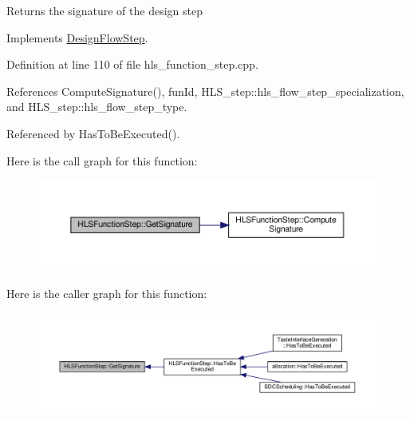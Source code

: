 \begin{DoxyReturn}{Returns}
the signature of the design step 
\end{DoxyReturn}


Implements \hyperlink{classDesignFlowStep_ab111e3d4058615c2dedc0505978d4699}{Design\+Flow\+Step}.



Definition at line 110 of file hls\+\_\+function\+\_\+step.\+cpp.



References Compute\+Signature(), fun\+Id, H\+L\+S\+\_\+step\+::hls\+\_\+flow\+\_\+step\+\_\+specialization, and H\+L\+S\+\_\+step\+::hls\+\_\+flow\+\_\+step\+\_\+type.



Referenced by Has\+To\+Be\+Executed().

Here is the call graph for this function\+:
\nopagebreak
\begin{figure}[H]
\begin{center}
\leavevmode
\includegraphics[width=350pt]{d9/d41/classHLSFunctionStep_a8f40b68d392790017292410850088887_cgraph}
\end{center}
\end{figure}
Here is the caller graph for this function\+:
\nopagebreak
\begin{figure}[H]
\begin{center}
\leavevmode
\includegraphics[width=350pt]{d9/d41/classHLSFunctionStep_a8f40b68d392790017292410850088887_icgraph}
\end{center}
\end{figure}
\mbox{\label{classHLSFunctionStep_ac70d2df8fd475639bf9b5c8d492b2d62}} 
